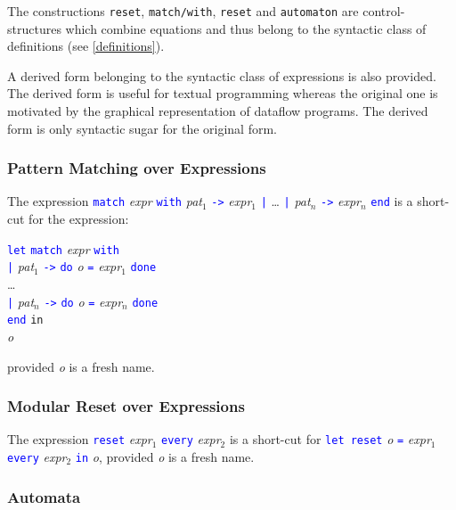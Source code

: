 \documentclass[11pt,titlepage,twoside]{report}
\newcommand{\In}{\mbox{{\tt in}}}
\newcommand{\Minusgreater}{\mbox{{\tt ->}}}
\newcommand{\term}[1]{\textcolor{Blue}{\tt #1}}
\newcommand{\nterm}[1]{\textcolor{BrickRed}{\it #1}}
\newcommand{\term}[1]{{\tt #1}}
\newcommand{\nterm}[1]{{\em #1}}
\begin{document}
The constructions \verb-reset-, \verb-match/with-, \verb-reset- and
\verb-automaton- are control-structures which combine equations and
thus belong to the syntactic class of definitions (see
\cref{definitions}).

A derived form belonging to the syntactic class of expressions is also
provided. The derived form is useful for textual programming whereas
the original one is motivated by the graphical representation of
dataflow programs. The derived form is only syntactic sugar for the
original form.

\subsubsection{Pattern Matching over Expressions} %

The expression
\term{match} \nterm{expr} \term{with} 
  \nterm{pat}$_1$ \term{\Minusgreater} \nterm{expr}$_1$ \term{|} \dots 
\term{|} \nterm{pat}$_n$ \term{\Minusgreater} \nterm{expr}$_n$ \term{end}
is a short-cut for the expression:

\begin{center}
\begin{tabbing}
\term{let} \= \term{match} \nterm{expr} \term{with} \\ 
           \> \term{|} \nterm{pat}$_1$ \term{\Minusgreater} 
               \term{do} \nterm{o} \term{=} \nterm{expr}$_1$ \term{done} \\
           \> \dots \\
           \> \term{|} \nterm{pat}$_n$ \term{\Minusgreater} 
               \term{do} \nterm{o} \term{=} \nterm{expr}$_n$ \term{done} \\
           \> \term{end} \In \\
\nterm{o}
\end{tabbing}
\end{center}
provided \nterm{o} is a fresh name.

\subsubsection{Modular Reset over Expressions} %

The expression \term{reset} \nterm{expr}$_1$ \term{every} \nterm{expr}$_2$
is a short-cut for
\term{let reset} \nterm{o} \term{=} \nterm{expr}$_1$ 
\term{every} \nterm{expr}$_2$ \term{in} \nterm{o},
provided \nterm{o} is a fresh name.

\subsubsection{Automata} %
\end{document}
